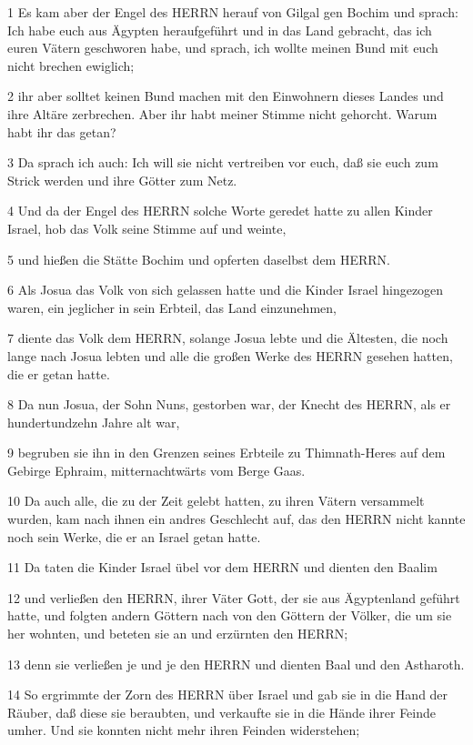 \par 1 Es kam aber der Engel des HERRN herauf von Gilgal gen Bochim und sprach: Ich habe euch aus Ägypten heraufgeführt und in das Land gebracht, das ich euren Vätern geschworen habe, und sprach, ich wollte meinen Bund mit euch nicht brechen ewiglich;
\par 2 ihr aber solltet keinen Bund machen mit den Einwohnern dieses Landes und ihre Altäre zerbrechen. Aber ihr habt meiner Stimme nicht gehorcht. Warum habt ihr das getan?
\par 3 Da sprach ich auch: Ich will sie nicht vertreiben vor euch, daß sie euch zum Strick werden und ihre Götter zum Netz.
\par 4 Und da der Engel des HERRN solche Worte geredet hatte zu allen Kinder Israel, hob das Volk seine Stimme auf und weinte,
\par 5 und hießen die Stätte Bochim und opferten daselbst dem HERRN.
\par 6 Als Josua das Volk von sich gelassen hatte und die Kinder Israel hingezogen waren, ein jeglicher in sein Erbteil, das Land einzunehmen,
\par 7 diente das Volk dem HERRN, solange Josua lebte und die Ältesten, die noch lange nach Josua lebten und alle die großen Werke des HERRN gesehen hatten, die er getan hatte.
\par 8 Da nun Josua, der Sohn Nuns, gestorben war, der Knecht des HERRN, als er hundertundzehn Jahre alt war,
\par 9 begruben sie ihn in den Grenzen seines Erbteile zu Thimnath-Heres auf dem Gebirge Ephraim, mitternachtwärts vom Berge Gaas.
\par 10 Da auch alle, die zu der Zeit gelebt hatten, zu ihren Vätern versammelt wurden, kam nach ihnen ein andres Geschlecht auf, das den HERRN nicht kannte noch sein Werke, die er an Israel getan hatte.
\par 11 Da taten die Kinder Israel übel vor dem HERRN und dienten den Baalim
\par 12 und verließen den HERRN, ihrer Väter Gott, der sie aus Ägyptenland geführt hatte, und folgten andern Göttern nach von den Göttern der Völker, die um sie her wohnten, und beteten sie an und erzürnten den HERRN;
\par 13 denn sie verließen je und je den HERRN und dienten Baal und den Astharoth.
\par 14 So ergrimmte der Zorn des HERRN über Israel und gab sie in die Hand der Räuber, daß diese sie beraubten, und verkaufte sie in die Hände ihrer Feinde umher. Und sie konnten nicht mehr ihren Feinden widerstehen;

